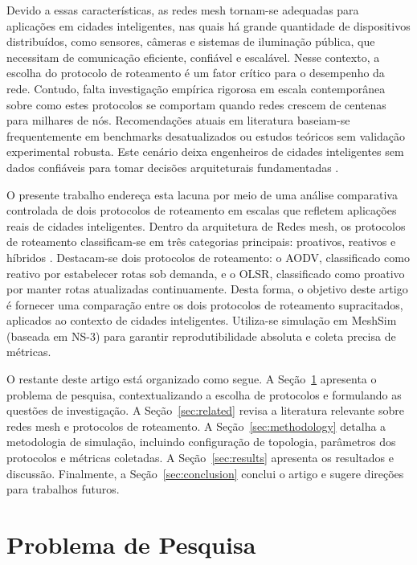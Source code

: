 \documentclass[12pt]{article}
\begin{document}
Devido a essas características, as redes mesh tornam-se adequadas para aplicações em cidades inteligentes, nas quais há grande quantidade de dispositivos distribuídos, como sensores, câmeras e sistemas de iluminação pública, que necessitam de comunicação eficiente, confiável e escalável. Nesse contexto, a escolha do protocolo de roteamento é um fator crítico para o desempenho da rede. Contudo, falta investigação empírica rigorosa em escala contemporânea sobre como estes protocolos se comportam quando redes crescem de centenas para milhares de nós. Recomendações atuais em literatura baseiam-se frequentemente em benchmarks desatualizados ou estudos teóricos sem validação experimental robusta. Este cenário deixa engenheiros de cidades inteligentes sem dados confiáveis para tomar decisões arquiteturais fundamentadas \cite{wireless_akyildiz_2005}.

O presente trabalho endereça esta lacuna por meio de uma análise comparativa controlada de dois protocolos de roteamento em escalas que refletem aplicações reais de cidades inteligentes. Dentro da arquitetura de Redes mesh, os protocolos de roteamento classificam-se em três categorias principais: proativos, reativos e híbridos \cite{wireless_benyamina_2012}. Destacam-se dois protocolos de roteamento: o AODV, classificado como reativo por estabelecer rotas sob demanda, e o OLSR, classificado como proativo por manter rotas atualizadas continuamente. Desta forma, o objetivo deste artigo é fornecer uma comparação entre os dois protocolos de roteamento supracitados, aplicados ao contexto de cidades inteligentes. Utiliza-se simulação em MeshSim (baseada em NS-3) para garantir reprodutibilidade absoluta e coleta precisa de métricas. 

O restante deste artigo está organizado como segue. A Seção~\ref{sec:research_problem} apresenta o problema de pesquisa, contextualizando a escolha de protocolos e formulando as questões de investigação. A Seção~\ref{sec:related} revisa a literatura relevante sobre redes mesh e protocolos de roteamento. A Seção~\ref{sec:methodology} detalha a metodologia de simulação, incluindo configuração de topologia, parâmetros dos protocolos e métricas coletadas. A Seção~\ref{sec:results} apresenta os resultados e discussão. Finalmente, a Seção~\ref{sec:conclusion} conclui o artigo e sugere direções para trabalhos futuros.

\section{Problema de Pesquisa}\label{sec:research_problem}
\end{document}
